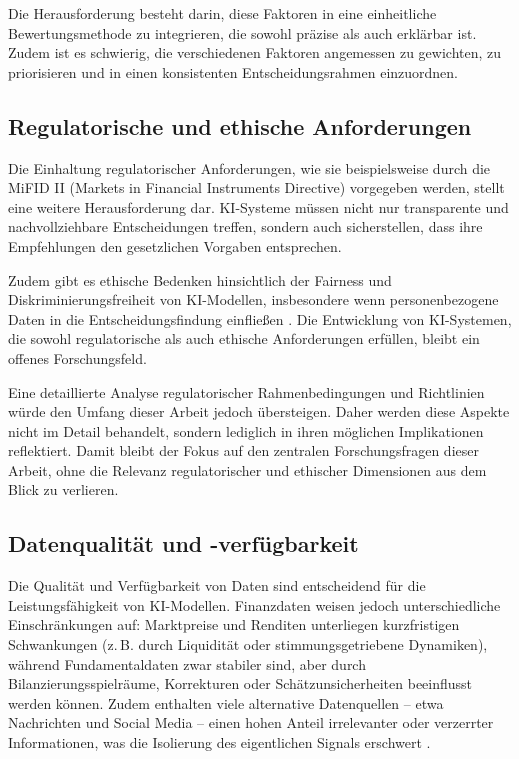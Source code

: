     Die Herausforderung besteht darin, diese Faktoren in eine einheitliche Bewertungsmethode zu integrieren, die sowohl präzise als auch erklärbar ist.
    Zudem ist es schwierig, die verschiedenen Faktoren angemessen zu gewichten, zu priorisieren und in einen konsistenten Entscheidungsrahmen einzuordnen.

  \subsection{Regulatorische und ethische Anforderungen}

    Die Einhaltung regulatorischer Anforderungen, wie sie beispielsweise durch die MiFID II (Markets in Financial Instruments Directive) vorgegeben werden, stellt eine weitere Herausforderung dar.
    \acs{KI}-Systeme müssen nicht nur transparente und nachvollziehbare Entscheidungen treffen, sondern auch sicherstellen, dass ihre Empfehlungen den gesetzlichen Vorgaben entsprechen.

    Zudem gibt es ethische Bedenken hinsichtlich der Fairness und Diskriminierungsfreiheit von \acs{KI}-Modellen, insbesondere wenn personenbezogene Daten in die Entscheidungsfindung einfließen \autocite{bendavid2021explainable}.
    Die Entwicklung von \acs{KI}-Systemen, die sowohl regulatorische als auch ethische Anforderungen erfüllen, bleibt ein offenes Forschungsfeld.

    Eine detaillierte Analyse regulatorischer Rahmenbedingungen und Richtlinien würde den Umfang dieser Arbeit jedoch übersteigen.
    Daher werden diese Aspekte nicht im Detail behandelt, sondern lediglich in ihren möglichen Implikationen reflektiert.
    Damit bleibt der Fokus auf den zentralen Forschungsfragen dieser Arbeit, ohne die Relevanz regulatorischer und ethischer Dimensionen aus dem Blick zu verlieren.

  \subsection{Datenqualität und -verfügbarkeit}

    Die Qualität und Verfügbarkeit von Daten sind entscheidend für die Leistungsfähigkeit von \acs{KI}-Modellen.
    Finanzdaten weisen jedoch unterschiedliche Einschränkungen auf: Marktpreise und Renditen unterliegen kurzfristigen Schwankungen (z.\,B. durch Liquidität oder stimmungsgetriebene Dynamiken), während Fundamentaldaten zwar stabiler sind, aber durch Bilanzierungsspielräume, Korrekturen oder Schätzunsicherheiten beeinflusst werden können.
    Zudem enthalten viele alternative Datenquellen -- etwa Nachrichten und Social Media -- einen hohen Anteil irrelevanter oder verzerrter Informationen, was die Isolierung des eigentlichen Signals erschwert \autocite{sec2021gamestop,Weber2024}.

